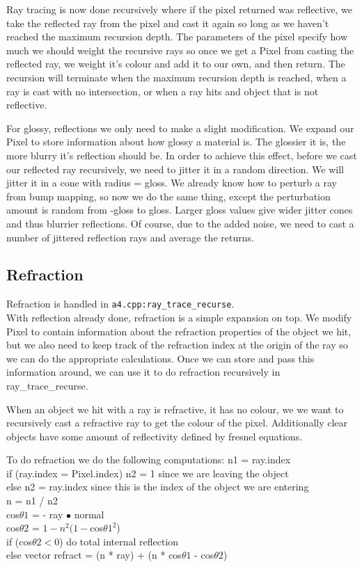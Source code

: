 \documentclass {article}
\begin{document}
Ray tracing is now done recursively where if the pixel returned was reflective,
we take the reflected ray from the pixel and cast it again so long as we haven't
reached the maximum recursion depth.  The parameters of the pixel specify how
much we should weight the recursive rays so once we get a Pixel from casting
the reflected ray, we weight it's colour and add it to our own, and then return.
The recursion will terminate when the maximum recursion depth is reached, when a
ray is cast with no intersection, or when a ray hits and object that is not
reflective.

For glossy, reflections we only need to make a slight modification.  We expand
our Pixel to store information about how glossy a material is.  The glossier it
is, the more blurry it's reflection should be.  In order to achieve this effect,
before we cast our reflected ray recursively, we need to jitter it in a random
direction.  We will jitter it in a cone with radius = gloss.  We already know
how to perturb a ray from bump mapping, so now we do the same thing, except the
perturbation amount is random from -gloss to gloss.  Larger gloss values give
wider jitter cones and thus blurrier reflections.  Of course, due to the added
noise, we need to cast a number of jittered reflection rays and average the
returns.

\subsection{Refraction}
Refraction is handled in \verb!a4.cpp:ray_trace_recurse!.\\

With reflection already done, refraction is a simple expansion on top.  We
modify Pixel to contain information about the refraction properties of the
object we hit, but we also need to keep track of the refraction index at the
origin of the ray so we can do the appropriate calculations.  Once we can store
and pass this information around, we can use it to do refraction recursively in
ray\_trace\_recurse.

When an object we hit with a ray is refractive, it has no colour, we we want to
recursively cast a refractive ray to get the colour of the pixel.  Additionally
clear objects have some amount of reflectivity defined by fresnel equations.

To do refraction we do the following computations:
n1 = ray.index\\
if (ray.index = Pixel.index) n2 = 1 since we are leaving the object\\
else n2 = ray.index since this is the index of the object we are entering\\
n = n1 / n2\\
cos$\theta1$ = - ray $\bullet$ normal\\
cos$\theta2$ = $1 - n^2(1 - $cos$\theta1^2$)\\
if (cos$\theta2 < 0$) do total internal reflection\\
else vector refract = (n * ray) + (n * cos$\theta1$ - cos$\theta2$)\\
\end{document}

